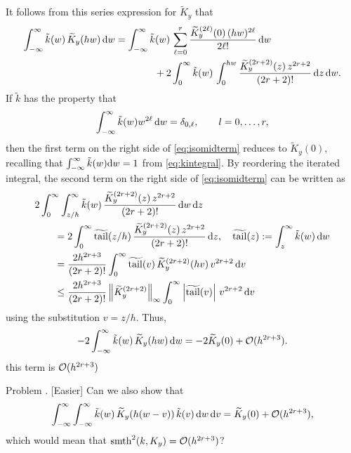 \documentclass[letterpaper]{amsart}
\newcommand{\KY}{K_y}
\newcommand{\tKY}{\widetilde{K}_y}
\newcommand{\tk}{\tilde{k}}
\DeclareMathOperator{\ttk}{\widetilde{tail}}
\DeclareMathOperator{\smooth}{smth}
\newcounter{probcnt}
\newenvironment{Problem}{\bigskip \LARGE \color{red} \refstepcounter{probcnt} \noindent Problem \theprobcnt. }{\normalsize \color{black} \bigskip}
\begin{document}
It follows from this series expression for $\tKY$ that
\begin{align} \label{eq:isomidterm}
	\int_{-\infty}^{\infty} \tk(w) \, \tKY(hw) \, \dif w & =
	\int_{-\infty}^{\infty} \tk(w) \, \sum_{\ell = 0}^{r} \frac{\tKY^{(2\ell)}(0) \, (hw)^{2\ell}}{2\ell!}  \, \dif w \\
	&
	\nonumber
	\qquad \qquad
	+ 2 \int_{0}^{\infty} \tk(w) \,  \int_0^{hw} \frac{\tKY^{(2r+2)}(z) \,  z^{2r+2}}{(2r+2)!} \, \dif z  \, \dif w.
\end{align}
If $\tk$ has the property that
\begin{equation} \label{eq:tkprop}
	\int_{-\infty}^{\infty} \tk(w) w^{2\ell}  \, \dif w =  \delta_{0,\ell}, \qquad l=0,\dots,r,
\end{equation}
then the first term on the right side of \eqref{eq:isomidterm} reduces to $\tKY(0)$, recalling that $\int_{-\infty}^\infty \tilde{k}(w) {\rm d} w = 1$ from \eqref{eq:kintegral}.   By reordering the iterated integral, the  second term on the right side of  \eqref{eq:isomidterm} can be written as
\begin{align*}
	\MoveEqLeft{2 \int_{0}^{\infty}  \int_{z/h}^\infty \tk(w) \, \frac{\tKY^{(2r+2)}(z) \,  z^{2r+2}}{(2r+2)!}   \, \dif w \, \dif z} \\
	& =  2\int_{0}^{\infty}  \ttk(z/h) \, \frac{\tKY^{(2r+2)}(z) \,  z^{2r+2}}{(2r+2)!}    \, \dif z,
	\quad \ttk(z) := \int_{z}^\infty \tk(w) \, \dif w \\
	& =  \frac{2h^{2r+3}}{(2r+2)!} \int_{0}^{\infty}  \ttk(v) \, \tKY^{(2r+2)}(hv) \,  v^{2r+2}    \, \dif v \\
	&  \le  \frac{2h^{2r+3}}{(2r+2)!}  \norm[\infty]{\tKY^{(2r+2)}} \int_{0}^{\infty}  \abs{\ttk(v)}  \,  v^{2r+2}    \, \dif v \\
\end{align*}
using the substitution $v = z/h$.  Thus, 
\[
- 2 \int_{-\infty}^{\infty} \tk(w) \, \tKY(hw) \, \dif w  = -2\tKY(0) + \Order(h^{2r+3}).
\]
this term is $\operatorname{{\mathcal O}}(h^{2r+3})$

\begin{Problem} [Easier]
    Can we also show that 
    \[
    \int_{-\infty}^{\infty} \int_{-\infty}^{\infty}  \tk(w) \, \tKY(h(w-v)) \, \tk(v)\, \dif w \, \dif v = \tKY(0) + \Order(h^{2r+3}),
    \]
    which would mean that $\smooth^2(k,\KY) =\Order(h^{2r+3}) $?
\end{Problem}
\end{document}
